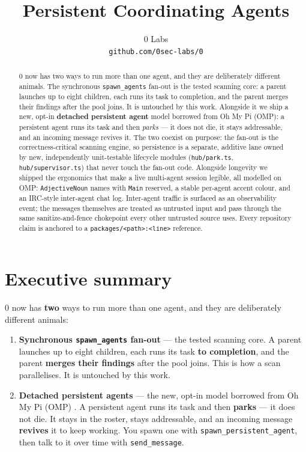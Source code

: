 \documentclass[11pt]{article}
\title{Persistent Coordinating Agents}
\author{
  0 Labs \\
  \texttt{github.com/0sec-labs/0}
}
\date{}
\begin{document}
\maketitle

\begin{abstract}
0 now has two ways to run more than one agent, and they are deliberately
different animals. The synchronous \texttt{spawn\_agents} fan-out is the tested
scanning core: a parent launches up to eight children, each runs its task to
completion, and the parent merges their findings after the pool joins. It is
untouched by this work. Alongside it we ship a new, opt-in \textbf{detached
persistent agent} model borrowed from Oh My Pi (OMP): a persistent agent runs its
task and then \textit{parks} --- it does not die, it stays addressable, and an
incoming message revives it. The two coexist on purpose: the fan-out is the
correctness-critical scanning engine, so persistence is a separate, additive lane
owned by new, independently unit-testable lifecycle modules
(\texttt{hub/park.ts}, \texttt{hub/supervisor.ts}) that never touch the fan-out
code. Alongside longevity we shipped the ergonomics that make a live multi-agent
session legible, all modelled on OMP: \texttt{AdjectiveNoun} names with
\texttt{Main} reserved, a stable per-agent accent colour, and an IRC-style
inter-agent chat log. Inter-agent traffic is surfaced as an observability event;
the messages themselves are treated as untrusted input and pass through the same
sanitize-and-fence chokepoint every other untrusted source uses. Every repository
claim is anchored to a \texttt{packages/<path>:<line>} reference.
\end{abstract}

\section{Executive summary}

0 now has \textbf{two} ways to run more than one agent, and they are
deliberately different animals:

\begin{enumerate}[leftmargin=*]
  \item \textbf{Synchronous \texttt{spawn\_agents} fan-out} --- the tested
  scanning core. A parent launches up to eight children, each runs its task
  \textbf{to completion}, and the parent \textbf{merges their findings} after the
  pool joins. This is how a scan parallelises. It is untouched by this work.
  \item \textbf{Detached persistent agents} --- the new, opt-in model borrowed
  from Oh My Pi (OMP) \citep{omp}. A persistent agent runs its task and then
  \textbf{parks} --- it does not die. It stays in the roster, stays addressable,
  and an incoming message \textbf{revives} it to keep working. You spawn one with
  \texttt{spawn\_persistent\_agent}, then talk to it over time with
  \texttt{send\_message}.
\end{enumerate}
\end{document}
